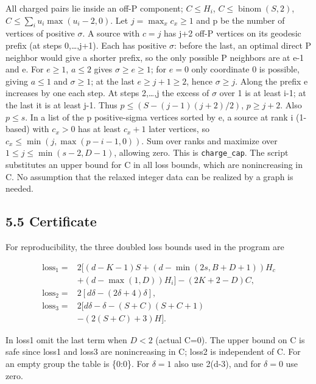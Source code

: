 \documentclass[
  11pt,
]{article}
\begin{document}
All charged pairs lie inside an off-P component; \(C\le H_{i}\),
\(C\le \operatorname{binom}(S,2)\), \(C\le\sum_i u_i\max(u_i-2,0)\). Let
\(j=\max_x c_x\ge1\) and p be the number of vertices of positive
\(\sigma\). A source with \(c=j\) has j+2 off-P vertices on its geodesic
prefix (at steps 0,\ldots,j+1). Each has positive \(\sigma\): before the
last, an optimal direct P neighbor would give a shorter prefix, so the
only possible P neighbors are at e-1 and e. For \(e\ge 1\), \(a\le 2\)
gives \(\sigma \ge e\ge 1\); for \(e=0\) only coordinate 0 is possible,
giving \(a\le 1\) and \(\sigma \ge 1\); at the last \(e\ge j+1\ge 2\),
hence \(\sigma \ge j\). Along the prefix e increases by one each step.
At steps 2,\ldots,j the excess of \(\sigma\) over 1 is at least i-1; at
the last it is at least j-1. Thus \(p\le (S-(j-1)(j+2)/2)\),
\(p\ge j+2\). Also \(p\le s\). In a list of the p positive-sigma
vertices sorted by e, a source at rank i (1-based) with \(c_{x}>0\) has
at least \(c_{x}+1\) later vertices, so
\(c_{x}\le \operatorname{min}(j,\operatorname{max}(p-i-1,0))\). Sum over
ranks and maximize over \(1\le j\le \operatorname{min}(s-2,D-1)\),
allowing zero. This is \texttt{charge\_cap}. The script substitutes an
upper bound for C in all loss bounds, which are nonincreasing in C. No
assumption that the relaxed integer data can be realized by a graph is
needed.

\subsection{5.5 Certificate}\label{certificate}

For reproducibility, the three doubled loss bounds used in the program
are

\[\begin{aligned}
\mathrm{loss}_1={}&2[(d-K-1)S+(d-\min(2s,B+D+1))H_c\\
&+(d-\max(1,D))H_i]-(2K+2-D)C,\\
\mathrm{loss}_2={}&2[d\delta-(2\delta+4)\delta],\\
\mathrm{loss}_3={}&2[d\delta-\delta-(S+C)(S+C+1)\\
&-(2(S+C)+3)H].
\end{aligned}\]

In loss1 omit the last term when \(D<2\) (actual C=0). The upper bound
on C is safe since loss1 and loss3 are nonincreasing in C; loss2 is
independent of C. For an empty group the table is \{0:0\}. For
\(\delta =1\) also use 2(d-3), and for \(\delta =0\) use zero.
\end{document}

